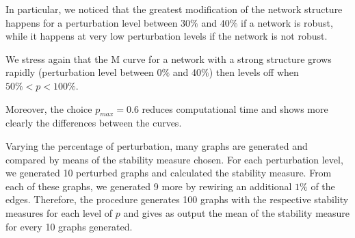 In particular, we noticed that the greatest modification of the network structure happens for a perturbation level between $30\%$ and $40\%$ if a network is robust, while it happens at very low perturbation levels if the network is not robust. 

We stress again that the M curve for a network with a strong structure grows rapidly (perturbation level between 0$\%$ and 40$\%$) then levels off when $50\%<p<100\%$.

Moreover, the choice $p_{max}=0.6$ reduces computational time and shows more clearly the differences between the curves.


Varying the percentage of perturbation, many graphs are generated and compared by means of the stability measure chosen. For each perturbation level, we generated 10 perturbed graphs and calculated the stability measure. From each of these graphs, we generated 9 more by rewiring an additional $1\%$ of the edges. Therefore, the procedure generates 100 graphs with the respective stability measures for each level of $p$ and gives as output the mean of the stability measure for every 10 graphs generated.


